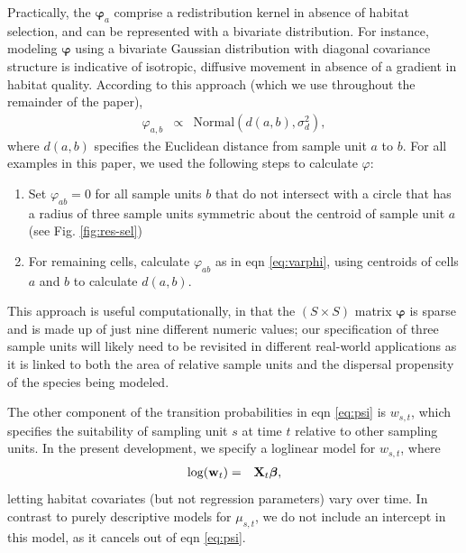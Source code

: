 \documentclass[times,mee,doublespace,]{besauth2}
\begin{document}
Practically, the $\boldsymbol{\varphi}_a$ comprise a redistribution kernel in absence of habitat selection, and can be represented with a bivariate distribution.  For instance, modeling $\boldsymbol{\varphi}$ using a bivariate Gaussian distribution with diagonal covariance structure is indicative of isotropic, diffusive movement in absence of a gradient in habitat quality.  According to this approach (which we use throughout the remainder of the paper),
\begin{eqnarray}
  \varphi_{a,b} & \propto & \text{Normal}(d(a,b),\sigma_d^2), \label{eq:varphi}
\end{eqnarray}
where $d(a,b)$ specifies the Euclidean distance from sample unit $a$ to $b$.  For all examples in this paper, we used the following steps to calculate $\varphi$:
\begin{enumerate}
  \item Set $\varphi_{ab}=0$ for all sample units $b$ that do not intersect with a circle that has a radius of three sample units symmetric about the centroid of sample unit $a$ (see Fig. \ref{fig:res-sel})
  \item For remaining cells, calculate $\varphi_{ab}$ as in eqn \ref{eq:varphi}, using centroids of cells $a$ and $b$ to calculate $d(a,b)$.
\end{enumerate}
This approach is useful computationally, in that the $(S \times S)$ matrix $\boldsymbol{\varphi}$ is sparse and is made up of just nine different numeric values; our specification of three sample units will likely need to be revisited in different real-world applications as it is linked to both the area of relative sample units and the dispersal propensity of the species being modeled.

The other component of the transition probabilities in eqn \ref{eq:psi} is $w_{s,t}$, which specifies the suitability of sampling unit $s$ at time $t$ relative to other sampling units.  In the present development, we specify a loglinear model for $w_{s,t}$, where
\begin{eqnarray*}
  \log({\bf w}_t) & = & {\bf X}_t \boldsymbol{\beta}, %
\end{eqnarray*}
letting habitat covariates (but not regression parameters) vary over time.  In contrast to purely descriptive models for $\mu_{s,t}$, we do not include an intercept in this model, as it cancels out of eqn \ref{eq:psi}.
\end{document}
